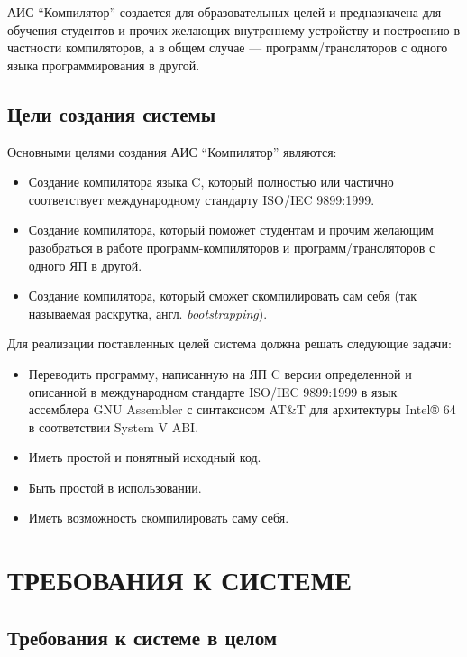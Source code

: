 \documentclass[14pt,russian]{extarticle}
\begin{document}
АИС \enquote{Компилятор} создается для образовательных целей и предназначена для
обучения студентов и прочих желающих внутреннему устройству и построению в
частности компиляторов, а в общем случае --- программ\-/трансляторов с одного языка
программирования в другой.

\subsection{Цели создания системы}

Основными целями создания АИС \enquote{Компилятор} являются:

\begin{itemize}
	\item Создание компилятора языка C, который полностью или частично
		соответствует международному стандарту ISO/IEC 9899:1999.
	\item Создание компилятора, который поможет студентам и прочим желающим
		разобраться в работе программ-компиляторов и программ\-/трансляторов с одного
		ЯП в другой.
	\item Создание компилятора, который сможет скомпилировать сам себя (так
		называемая раскрутка, англ. \textit{bootstrapping}).
\end{itemize}

Для реализации поставленных целей система должна решать следующие задачи:

\begin{itemize}
	\item Переводить программу, написанную на ЯП C версии определенной и описанной
		в международном стандарте ISO/IEC 9899:1999 в язык ассемблера GNU Assembler
		с синтаксисом AT\&T для архитектуры Intel® 64 в соответствии System V ABI.
	\item Иметь простой и понятный исходный код.
	\item Быть простой в использовании.
	\item Иметь возможность скомпилировать саму себя.
\end{itemize}

\clearpage
\section{ТРЕБОВАНИЯ К СИСТЕМЕ}

\subsection{Требования к системе в целом}
\end{document}
